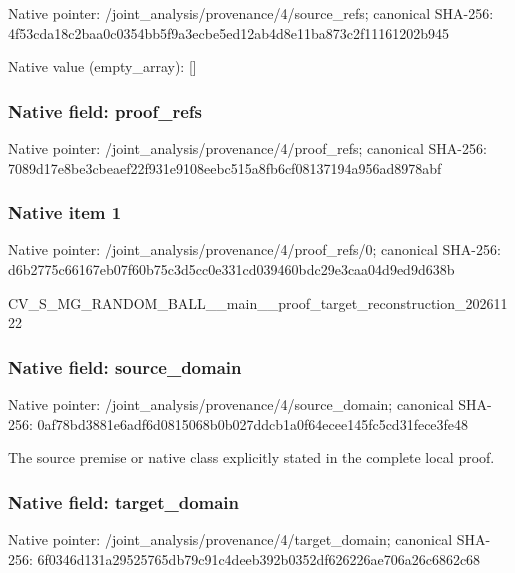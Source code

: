 \documentclass[10pt,a4paper]{article}
\begin{document}
Native pointer: /joint\_analysis/provenan\allowbreak{}ce/4/source\_refs; canonical SHA-256: 4f53cda18c2baa0c0354bb5f\allowbreak{}9a3ecbe5ed12ab4d8e11ba87\allowbreak{}3c2f11161202b945



Native value (empty\_array): []



\subsubsection{Native field: proof\_refs}


Native pointer: /joint\_analysis/provenance/4/proof\_refs; canonical SHA-256: 7089d17e8be3cbeaef22f931\allowbreak{}e9108eebc515a8fb6cf08137\allowbreak{}194a956ad8978abf



\subsubsection{Native item 1}


Native pointer: /joint\_analysis/provenan\allowbreak{}ce/4/proof\_refs/0; canonical SHA-256: d6b2775c66167eb07f60b75c\allowbreak{}3d5cc0e331cd039460bdc29e\allowbreak{}3caa04d9ed9d638b


CV\_S\_MG\_RANDOM\_BALL\_\_mai\allowbreak{}n\_\_proof\_target\_reconstr\allowbreak{}uction\_20261122


\subsubsection{Native field: source\_domain}


Native pointer: /joint\_analysis/provenan\allowbreak{}ce/4/source\_domain; canonical SHA-256: 0af78bd3881e6adf6d081506\allowbreak{}8b0b027ddcb1a0f64ecee145\allowbreak{}fc5cd31fece3fe48


The source premise or native class explicitly stated in the complete local proof.


\subsubsection{Native field: target\_domain}


Native pointer: /joint\_analysis/provenan\allowbreak{}ce/4/target\_domain; canonical SHA-256: 6f0346d131a29525765db79c\allowbreak{}91c4deeb392b0352df626226\allowbreak{}ae706a26c6862c68
\end{document}

